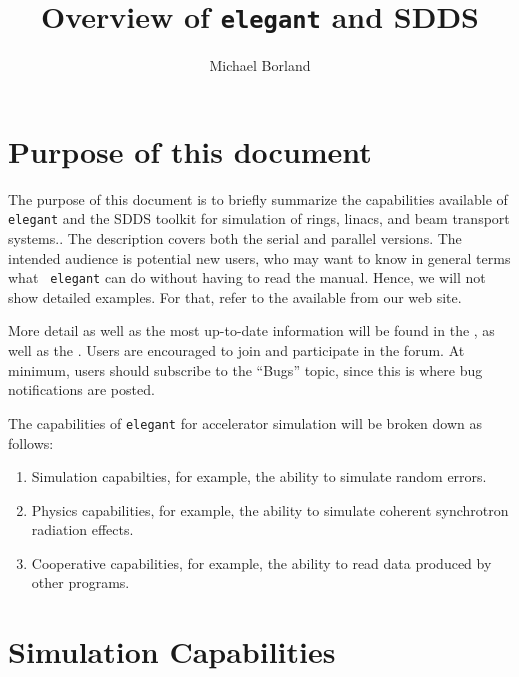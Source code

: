\documentclass[11pt]{article}
\begin{document}
\author{Michael Borland}
\title{Overview of {\tt elegant} and SDDS}
\maketitle

\section{Purpose of this document}

The purpose of this document is to briefly summarize the capabilities
available of {\tt elegant} and the SDDS toolkit for simulation of
rings, linacs, and beam transport systems..  The description covers
both the serial and parallel versions.  The intended audience is
potential new users, who may want to know in general terms what {\tt
elegant} can do without having to read the manual.  Hence, we will not
show detailed examples.  For that, refer to the
available from our web site.

More detail as well as the most up-to-date information will be found in the 
,
as well as the 
.  Users are encouraged
to join and participate in the forum.  At minimum, users should subscribe to the ``Bugs'' topic,
since this is where bug notifications are posted.

The capabilities of {\tt elegant} for accelerator simulation will be broken down as follows:
\begin{enumerate}
\item Simulation capabilties, for example, the ability to simulate random errors.
\item Physics capabilities, for example, the ability to simulate coherent synchrotron radiation effects.
\item Cooperative capabilities, for example, the ability to read data produced by other programs.
\end{enumerate}

\section{Simulation Capabilities}
\end{document}
